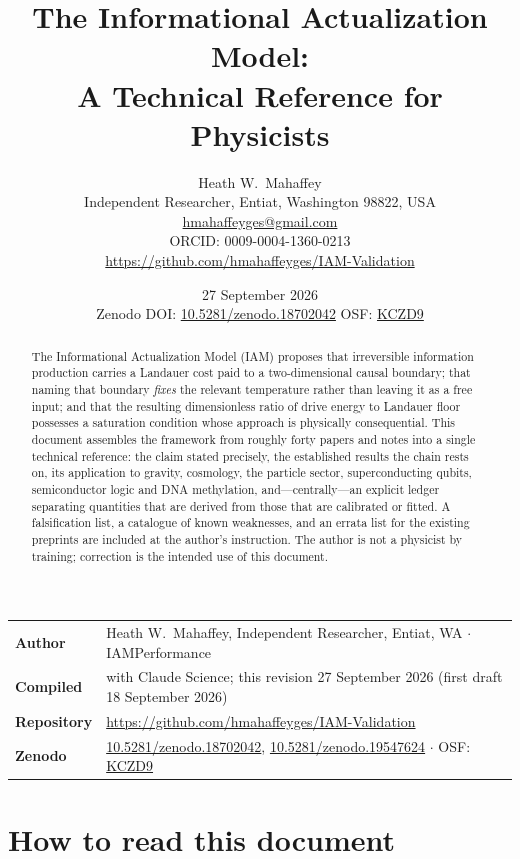 \documentclass[12pt,a4paper]{article}
\title{\textbf{The Informational Actualization Model:\\
A Technical Reference for Physicists}}
\author{Heath W.\ Mahaffey\\
\small Independent Researcher, Entiat, Washington 98822, USA\\
\small \href{mailto:hmahaffeyges@gmail.com}{hmahaffeyges@gmail.com}\\
\small ORCID: 0009-0004-1360-0213\\
\small \url{https://github.com/hmahaffeyges/IAM-Validation}}
\date{27 September 2026\\
\small Zenodo DOI: \href{https://doi.org/10.5281/zenodo.18702042}{10.5281/zenodo.18702042}
\quad OSF: \href{https://osf.io/kczd9}{KCZD9}}
\begin{document}
\maketitle

\begin{abstract}
\noindent
The Informational Actualization Model (IAM) proposes that irreversible information
production carries a Landauer cost paid to a two-dimensional causal boundary; that naming
that boundary \emph{fixes} the relevant temperature rather than leaving it as a free input;
and that the resulting dimensionless ratio of drive energy to Landauer floor possesses a
saturation condition whose approach is physically consequential. This document assembles the
framework from roughly forty papers and notes into a single technical reference: the claim
stated precisely, the established results the chain rests on, its application to gravity,
cosmology, the particle sector, superconducting qubits, semiconductor logic and DNA
methylation, and---centrally---an explicit ledger separating quantities that are derived from
those that are calibrated or fitted. A falsification list, a catalogue of known weaknesses,
and an errata list for the existing preprints are included at the author's instruction. The
author is not a physicist by training; correction is the intended use of this document.
\end{abstract}

\tableofcontents
\bigskip

\begin{small}
\noindent\begin{tabular}{@{}ll@{}}
\textbf{Author} & Heath W.\ Mahaffey, Independent Researcher, Entiat, WA $\cdot$ IAMPerformance \\
\textbf{Compiled} & with Claude Science; this revision 27 September 2026 (first draft 18 September 2026) \\
\textbf{Repository} & \url{https://github.com/hmahaffeyges/IAM-Validation} \\
\textbf{Zenodo} & \href{https://doi.org/10.5281/zenodo.18702042}{10.5281/zenodo.18702042}, \href{https://doi.org/10.5281/zenodo.19547624}{10.5281/zenodo.19547624} $\cdot$ OSF: \href{https://osf.io/kczd9}{KCZD9} \\
\end{tabular}
\end{small}







\section{How to read this document}
\end{document}
